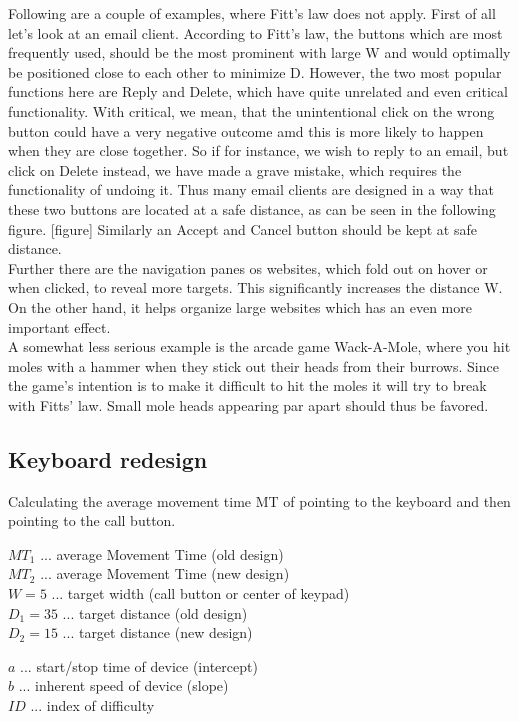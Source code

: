 \documentclass[a4paper,twoside,10pt]{article}
\begin{document}
Following are a couple of examples, where Fitt's law does not apply. First of all let's look at an email client. According to Fitt's law, the buttons which are most frequently used, should be the most prominent with large W and would optimally be positioned close to each other to minimize D. However, the two most popular functions here are Reply and Delete, which have quite unrelated and even critical functionality. With critical, we mean, that the unintentional click on the wrong button could have a very negative outcome amd this is more likely to happen when they are close together. So if for instance, we wish to reply to an email, but click on Delete instead, we have made a grave mistake, which requires the functionality of undoing it. Thus many email clients are designed in a way that these two buttons are located at a safe distance, as can be seen in the following figure. [figure] Similarly an Accept and Cancel button should be kept at safe distance.\\
Further there are the navigation panes os websites, which fold out on hover or when clicked, to reveal more targets. This significantly increases the distance W. On the other hand, it helps organize large websites which has an even more important effect.\\A somewhat less serious example is the arcade game Wack-A-Mole, where you hit moles with a hammer when they stick out their heads from their burrows. Since the game's intention is to make it difficult to hit the moles it will try to break with Fitts' law. Small mole heads appearing par apart should thus be favored.

\subsection{Keyboard redesign} 
Calculating the average movement time MT of pointing to the keyboard and then pointing to the call button.

$MT_1$ ... average Movement Time (old design) \\
$MT_2$ ... average Movement Time (new design) \\
$W = 5$ ... target width (call button or center of keypad) \\
$D_1 = 35$ ...  target distance (old design) \\
$D_2 = 15$ ... target distance (new design) 

$a$ ... start/stop time of device (intercept) \\
$b$ ... inherent speed of device (slope) \\
$ID$ ... index of difficulty
\end{document}
